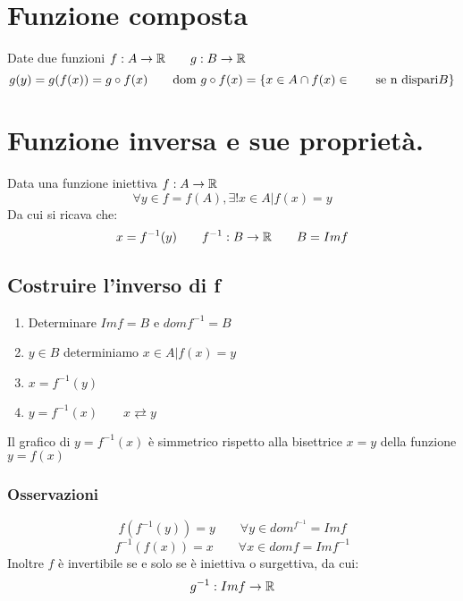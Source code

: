 \section{Funzione composta}
Date due funzioni $f:A\rightarrow \mathbb{R} \qquad g:B\rightarrow \mathbb{R}$
\[g(y)=g(f(x))=g\circ f(x) \qquad \text{dom }g\circ f(x)=\{x\in A \cap f(x) \in \qquad \text{se n dispari} \\ B\}\]

\section{Funzione inversa e sue proprietà.}
Data una funzione iniettiva $f:A\rightarrow \mathbb{R}$
\[\forall y \in f=f(A), \exists ! x\in A | f(x)=y\]
Da cui si ricava che:
\[x=f^{-1}(y) \qquad f^{-1}: B\rightarrow \mathbb{R} \qquad B=Im f\]
\subsection{Costruire l'inverso di f}
\begin{enumerate}
	\item Determinare $Im f=B$ e $dom f^{-1}=B$
	\item $y \in B$ determiniamo $x \in A | f(x)=y$
	\item $x=f^{-1}(y)$
	\item $y=f^{-1}(x) \qquad x\rightleftarrows y$
\end{enumerate}
Il grafico di $y=f^{-1}(x)$ è simmetrico rispetto alla bisettrice $x=y$ della funzione $y=f(x)$
\subsubsection{Osservazioni}
\[f(f^{-1}(y)) = y \qquad \forall y \in dom^{f^{-1}}=Im f \]
\[f^{-1}(f(x)) = x \qquad \forall x \in dom f = Im f^{-1}\]
Inoltre $f$ è invertibile se e solo se è iniettiva o surgettiva, da cui: 
\[g^{-1}:Im f \rightarrow \mathbb{R}\]
